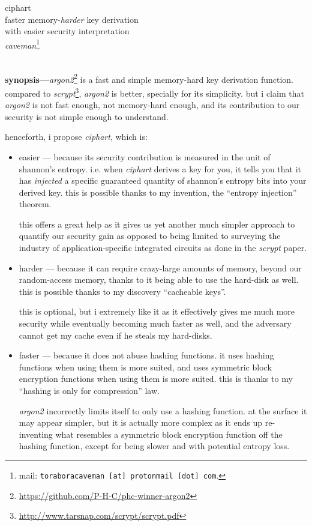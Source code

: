 \documentclass[twocolumn]{article}
\begin{document}
\SetInd{.15em}{1em}

\begin{center}
\Huge
ciphart\\
\Large
faster memory-\emph{harder} key derivation \\
with easier security interpretation\\
\normalsize
\emph{caveman}\footnote{mail: \texttt{toraboracaveman [at] protonmail [dot]
com}.}\\
\footnotesize
\DTMnow\\
\end{center}

\noindent\textbf{synopsis---}\emph{argon2}\footnote{\url{https://github.com/P-H-C/phc-winner-argon2}}
is a fast and simple memory-hard key derivation function.  compared to
\emph{scrypt}\footnote{\url{http://www.tarsnap.com/scrypt/scrypt.pdf}},
\emph{argon2} is better, specially for its simplicity.  but i claim that
\emph{argon2} is not fast enough, not memory-hard enough, and its
contribution to our security is not simple enough to understand.

henceforth, i propose \emph{ciphart}, which is:
\begin{itemize}
    \item easier --- because its security contribution is measured in the
    unit of shannon's entropy.  i.e. when \emph{ciphart} derives a key for
    you, it tells you that it has \emph{injected} a specific guaranteed
    quantity of shannon's entropy bits into your derived key.  this is
    possible thanks to my invention, the ``entropy injection'' theorem.

    this offers a great help as it gives us yet another much simpler
    approach to quantify our security gain as opposed to being limited to
    surveying the industry of application-specific integrated circuits as
    done in the \emph{scrypt} paper.

    \item harder --- because it can require crazy-large amounts of memory,
    beyond our random-access memory, thanks to it being able to use the
    hard-disk as well.  this is possible thanks to my discovery ``cacheable
    keys''.

    this is optional, but i extremely like it as it effectively gives me
    much more security while eventually becoming much faster as well, and
    the adversary cannot get my cache even if he steals my hard-disks.

    \item faster --- because it does not abuse hashing functions.  it uses
    hashing functions when using them is more suited, and uses symmetric
    block encryption functions when using them is  more suited.  this is
    thanks to my ``hashing is only for compression'' law.

    \emph{argon2} incorrectly limits itself to only use a hashing function.
    at the surface it may appear simpler, but it is actually more complex
    as it ends up re-inventing what resembles a symmetric block encryption
    function off the hashing function, except for being slower and with
    potential entropy loss.
\end{itemize}
\end{document}
